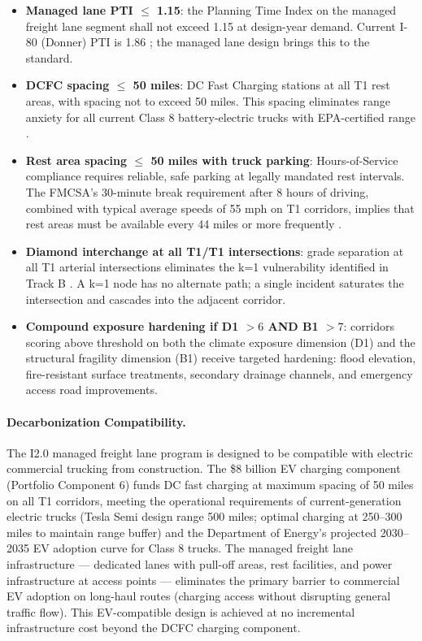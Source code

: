 \begin{itemize}
  \item \textbf{Managed lane PTI $\leq$ 1.15}: the Planning Time Index on the managed freight lane segment shall not exceed 1.15 at design-year demand. Current I-80 (Donner) PTI is 1.86 \citep{ROUTE_C1}; the managed lane design brings this to the standard.
  \item \textbf{DCFC spacing $\leq$ 50 miles}: DC Fast Charging stations at all T1 rest areas, with spacing not to exceed 50 miles. This spacing eliminates range anxiety for all current Class 8 battery-electric trucks with EPA-certified range \citep{FHWA_NHS2023}.
  \item \textbf{Rest area spacing $\leq$ 50 miles with truck parking}: Hours-of-Service compliance requires reliable, safe parking at legally mandated rest intervals. The FMCSA's 30-minute break requirement after 8 hours of driving, combined with typical average speeds of 55 mph on T1 corridors, implies that rest areas must be available every 44 miles or more frequently \citep{USDOT_FMCSA2022}.
  \item \textbf{Diamond interchange at all T1/T1 intersections}: grade separation at all T1 arterial intersections eliminates the k=1 vulnerability identified in Track B \citep{ROUTE_B4}. A k=1 node has no alternate path; a single incident saturates the intersection and cascades into the adjacent corridor.
  \item \textbf{Compound exposure hardening if D1 $> 6$ AND B1 $> 7$}: corridors scoring above threshold on both the climate exposure dimension (D1) and the structural fragility dimension (B1) receive targeted hardening: flood elevation, fire-resistant surface treatments, secondary drainage channels, and emergency access road improvements.
\end{itemize}

\paragraph{Decarbonization Compatibility.}
The I2.0 managed freight lane program is designed to be compatible with electric
commercial trucking from construction. The \$8 billion EV charging component
(Portfolio Component 6) funds DC fast charging at maximum spacing of 50 miles on
all T1 corridors, meeting the operational requirements of current-generation electric
trucks (Tesla Semi design range 500 miles; optimal charging at 250--300 miles to
maintain range buffer) and the Department of Energy's projected 2030--2035 EV adoption
curve for Class 8 trucks. The managed freight lane infrastructure --- dedicated lanes with
pull-off areas, rest facilities, and power infrastructure at access points --- eliminates
the primary barrier to commercial EV adoption on long-haul routes (charging access without
disrupting general traffic flow). This EV-compatible design is achieved at no incremental
infrastructure cost beyond the DCFC charging component.

